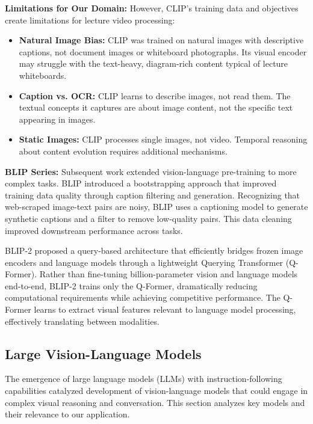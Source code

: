 \textbf{Limitations for Our Domain:} However, CLIP's training data and objectives create limitations for lecture video processing:
\begin{itemize}
    \item \textbf{Natural Image Bias:} CLIP was trained on natural images with descriptive captions, not document images or whiteboard photographs. Its visual encoder may struggle with the text-heavy, diagram-rich content typical of lecture whiteboards.
    \item \textbf{Caption vs. OCR:} CLIP learns to describe images, not read them. The textual concepts it captures are about image content, not the specific text appearing in images.
    \item \textbf{Static Images:} CLIP processes single images, not video. Temporal reasoning about content evolution requires additional mechanisms.
\end{itemize}

\textbf{BLIP Series:} Subsequent work extended vision-language pre-training to more complex tasks. BLIP \cite{Li2022BLIP} introduced a bootstrapping approach that improved training data quality through caption filtering and generation. Recognizing that web-scraped image-text pairs are noisy, BLIP uses a captioning model to generate synthetic captions and a filter to remove low-quality pairs. This data cleaning improved downstream performance across tasks.

BLIP-2 \cite{Li2023BLIP2} proposed a query-based architecture that efficiently bridges frozen image encoders and language models through a lightweight Querying Transformer (Q-Former). Rather than fine-tuning billion-parameter vision and language models end-to-end, BLIP-2 trains only the Q-Former, dramatically reducing computational requirements while achieving competitive performance. The Q-Former learns to extract visual features relevant to language model processing, effectively translating between modalities.

\subsection{Large Vision-Language Models}

The emergence of large language models (LLMs) with instruction-following capabilities \cite{Ouyang2022} catalyzed development of vision-language models that could engage in complex visual reasoning and conversation. This section analyzes key models and their relevance to our application.

